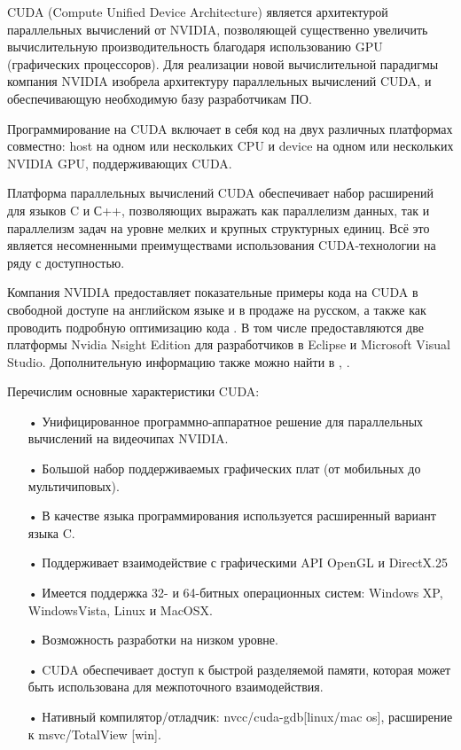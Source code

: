 \documentclass[a4paper,14pt,russian]{extreport}
\begin{document}
CUDA (Compute Unified Device Architecture) является архитектурой параллельных вычислений от NVIDIA, позволяющей существенно увеличить вычислительную производительность благодаря использованию GPU (графических процессоров). Для реализации новой вычислительной парадигмы компания NVIDIA изобрела архитектуру параллельных вычислений CUDA, и обеспечивающую необходимую базу разработчикам ПО.
\par Программирование на CUDA включает в себя код на двух различных платформах совместно: host на одном или нескольких CPU и device на одном или нескольких NVIDIA GPU, поддерживающих CUDA.
\par Платформа параллельных вычислений CUDA обеспечивает набор расширений для языков C и С++, позволяющих выражать как параллелизм данных, так и параллелизм задач на уровне мелких и крупных структурных единиц. Всё это является несомненными преимуществами использования CUDA-технологии на ряду с доступностью.
\par Компания NVIDIA предоставляет показательные примеры кода на CUDA \cite{sanders} в свободной доступе на английском языке и в продаже на русском, а также как проводить подробную оптимизацию кода \cite{cuda_best}. В том числе предоставляются две платформы Nvidia Nsight Edition для разработчиков в Eclipse и Microsoft Visual Studio. Дополнительную информацию также можно найти в \cite{kirk}, \cite{boreskov}.
\par Перечислим основные характеристики CUDA:
  \begin{itemize}
  \item[•] Унифицированное программно-аппаратное решение для параллельных вычислений на видеочипах NVIDIA.
  \item[•] Большой набор поддерживаемых графических плат (от мобильных до мультичиповых).
  \item[•] В качестве языка программирования используется расширенный вариант языка C.
  \item[•] Поддерживает взаимодействие с графическими API OpenGL и DirectX.25
  \item[•] Имеется поддержка 32- и 64-битных операционных систем: Windows XP, WindowsVista, Linux и MacOSX.
  \item[•] Возможность разработки на низком уровне.
  \item[•] CUDA обеспечивает доступ к быстрой разделяемой памяти, которая может быть использована для межпоточного взаимодействия.
  \item[•] Нативный компилятор/отладчик: nvcc/cuda-gdb[linux/mac os], расширение к msvc/TotalView [win]. 
  \end{itemize}
\end{document}
